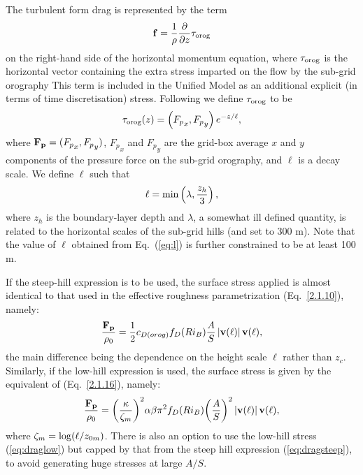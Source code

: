 \documentclass{UMDP_article}
\begin{document}
The turbulent form drag is represented by the term
\begin{equation}
  {\bf f}=\frac{1}{\rho}\frac{\partial}{\partial z}{\bf\tau}_{\rm orog}
  \label{eq:drag}
\end{equation}
on the right-hand side of the horizontal momentum equation, where
${\bf\tau}_{\rm orog}$ is the horizontal vector containing the extra
stress imparted on the flow by the sub-grid orography This term is
included in the Unified Model as an additional explicit (in terms of
time discretisation) stress. Following \cite{wood01:_param} we define
${\bf\tau}_{\rm orog}$ to be
\begin{equation}
  {\bf\tau}_{\rm orog}(z)=\left({F_p}_x,{F_p}_y\right)e^{-z/\ell},
\end{equation}
where ${\bf F_p}=({F_p}_x,{F_p}_y)$, ${F_p}_x$ and ${F_p}_y$ are the
grid-box average $x$ and $y$ components of the pressure force on the
sub-grid orography, and $\ell$ is a decay scale. We define $\ell$ such
that
\begin{equation}
  \ell={\rm min}\left(\lambda,\frac{z_h}{3}\right),
  \label{eq:l}
\end{equation}
where $z_h$ is the boundary-layer depth and $\lambda$, a somewhat ill
defined quantity, is related to the horizontal scales of the sub-grid
hills (and set to 300 m). Note that the value of $\ell$ obtained from
Eq.~(\ref{eq:l}) is further constrained to be at least 100 m.  

If the steep-hill expression is to be used, the surface stress applied is 
almost identical to that used in the effective roughness parametrization 
(Eq.~\ref{2.1.10}), namely:
\begin{equation}
  \frac{\bf F_p}{\rho_0}=\frac{1}{2}c_{D(orog)} f_D (Ri_{B}) \frac{A}{S}
  \left\vert{\rm{\bf v}}(\ell) \right\vert{\rm{\bf v}}(\ell),
  \label{eq:dragsteep}
\end{equation}
the main difference being the dependence on the height scale $\ell$ rather
than $z_c$.  Similarly, if the \cite{wood93} low-hill expression is used, the 
surface stress is given by the equivalent of (Eq.~\ref{2.1.16}), namely:
\begin{equation}
  \frac{\bf F_p}{\rho_0} = {\left( {\frac{\kappa}{\zeta_m}} \right)}^{2} 
                           \alpha \beta \pi ^{2} {f}_{D} (Ri_{B}) 
                            {\left( {\frac{A}{S}} \right)}^{2} 
  \left\vert{\rm{\bf v}}(\ell) \right\vert{\rm{\bf v}}(\ell),
  \label{eq:draglow}
\end{equation}
where $\zeta_m = {\rm log}(\ell/z_{0m})$.  There is also an option to use the 
low-hill stress (\ref{eq:draglow}) but capped by that from the steep hill 
expression (\ref{eq:dragsteep}), to avoid generating huge stresses at large $A/S$.
\end{document}
